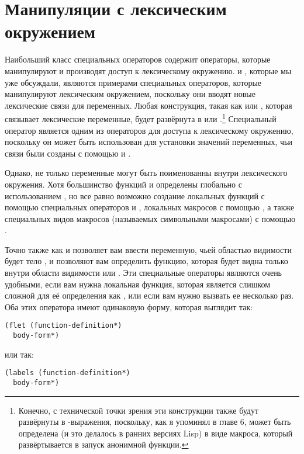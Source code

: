 \section{Манипуляции с лексическим окружением}

Наибольший класс специальных операторов содержит операторы, которые манипулируют и
производят доступ к лексическому окружению.  и , которые мы уже
обсуждали, являются примерами специальных операторов, которые манипулируют лексическим
окружением, поскольку они вводят новые лексические связи для переменных.  Любая
конструкция, такая как  или , которая связывает лексические
переменные, будет развёрнута в  или .\footnote{Конечно, с технической
  точки зрения эти конструкции также будут развёрнуты в -выражения,
  поскольку, как я упоминял в главе 6,  может быть определена (и это делалось в
  ранних версиях Lisp) в виде макроса, который развёртывается в запуск анонимной функции.}
Специальный оператор  является одним из операторов для доступа к лексическому
окружению, поскольку он может быть использован для установки значений переменных, чьи
связи были созданы с помощью  и .

Однако, не только переменные могут быть поименованны внутри лексического окружения.  Хотя
большинство функций и определены глобально с использованием , но все равно
возможно создание локальных функций с помощью специальных операторов  и
, локальных макросов с помощью , а также специальных видов
макросов (называемых символьными макросами) с помощью .

Точно также как и  позволяет вам ввести переменную, чьей областью видимости
будет тело ,  и  позволяют вам определить функцию,
которая будет видна только внутри области видимости  или .  Эти
специальные операторы являются очень удобными, если вам нужна локальная функция, которая
является слишком сложной для её определения как , или если вам нужно вызвать
ее несколько раз.  Оба этих оператора имеют одинаковую форму, которая выглядит так:

\begin{lstlisting}
(flet (function-definition*)
  body-form*)
\end{lstlisting}

или так:

\begin{lstlisting}
(labels (function-definition*)
  body-form*)
\end{lstlisting}

